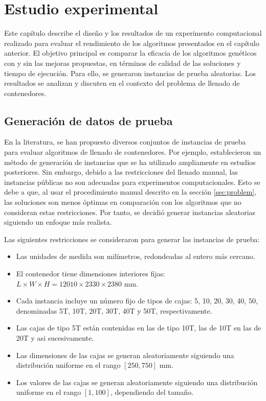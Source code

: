 \section{Estudio experimental}

Este capítulo describe el diseño y los resultados de un experimento computacional realizado para evaluar el rendimiento de los algoritmos presentados en el capítulo anterior. El objetivo principal es comparar la eficacia de los algoritmos genéticos con y sin las mejoras propuestas, en términos de calidad de las soluciones y tiempo de ejecución. Para ello, se generaron instancias de prueba aleatorias. Los resultados se analizan y discuten en el contexto del problema de llenado de contenedores.

\subsection{Generación de datos de prueba}

En la literatura, se han propuesto diversos conjuntos de instancias de prueba para evaluar algoritmos de llenado de contenedores. Por ejemplo, \textcite{BISCHOFF1995377} establecieron un método de generación de instancias que se ha utilizado ampliamente en estudios posteriores. Sin embargo, debido a las restricciones del llenado manual, las instancias públicas no son adecuadas para experimentos computacionales. Esto se debe a que, al usar el procedimiento manual descrito en la sección \ref{sec:problem}, las soluciones son menos óptimas en comparación con los algoritmos que no consideran estas restricciones. Por tanto, se decidió generar instancias aleatorias siguiendo un enfoque más realista.

Las siguientes restricciones se consideraron para generar las instancias de prueba:

\begin{itemize}
    \item Las unidades de medida son milímetros, redondeadas al entero más cercano.
    \item El contenedor tiene dimensiones interiores fijas: $L \times W \times H = 12010 \times 2330 \times 2380$ mm.
    \item Cada instancia incluye un número fijo de tipos de cajas: 5, 10, 20, 30, 40, 50, denominadas 5T, 10T, 20T, 30T, 40T y 50T, respectivamente.
    \item Las cajas de tipo 5T están contenidas en las de tipo 10T, las de 10T en las de 20T y asi sucesivamente.
    \item Las dimensiones de las cajas se generan aleatoriamente siguiendo una distribución uniforme en el rango $[250, 750]$ mm.
    \item Los valores de las cajas se generan aleatoriamente siguiendo una distribución uniforme en el rango $[1, 100]$, dependiendo del tamaño.
\end{itemize}

